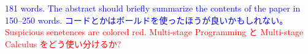 \documentclass[runningheads]{llncs}
\newcommand{\red}[1]{\textcolor{red}{#1 }}
\newcommand{\blue}[1]{\textcolor{blue}{#1 }}
\begin{document}
\blue{181 words. The abstract should briefly summarize the contents of the paper in 150--250 words.}
\blue{コードとかはボールドを使ったほうが良いかもしれない。}
\red{Suspicious senetences are colored red.}
%
%
%
\red{Multi-stage Programming と Multi-stage Calculus をどう使い分けるか?}













	      
	      
	      
	      
	      
\end{document}
